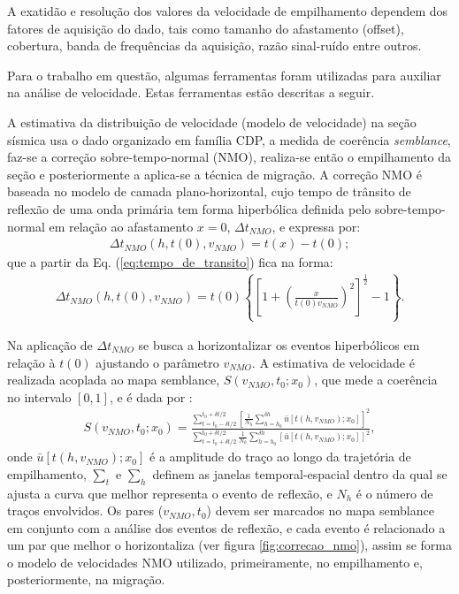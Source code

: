 A exatidão e resolução dos valores da velocidade de empilhamento dependem dos
fatores de aquisição do dado, tais como tamanho do afastamento (offset), cobertura, banda de
frequências da aquisição, razão sinal-ruído entre outros.

Para o trabalho em questão, algumas ferramentas foram utilizadas para auxiliar na
análise de velocidade. Estas ferramentas estão descritas a seguir.

A estimativa da distribuição de velocidade (modelo de velocidade) na seção sísmica usa o dado organizado em família CDP, a medida de coerência \textit{semblance},
faz-se a correção sobre-tempo-normal (NMO), realiza-se então o empilhamento da seção e posteriormente a aplica-se a técnica de migração.
A correção NMO é baseada no modelo de camada plano-horizontal, cujo tempo de trânsito de reflexão de uma onda primária tem forma hiperbólica definida pelo sobre-tempo-normal
em relação ao afastamento $x=0$, $\Delta t_{NMO}$, e expressa por:
\begin{eqnarray}
\Delta t_{NMO}(h,t(0),v_{NMO})=t(x)-t(0);
\label{t_NMO}
\end{eqnarray}
que a partir da Eq. (\ref{eq:tempo_de_transito}) fica na forma:
\begin{eqnarray}
\Delta t_{NMO}(h,t(0),v_{NMO})=t(0)\left\lbrace \left[ 1 + \left( \frac{x}{t(0)v_{NMO}}\right)^2\right]^{\frac{1}{2}}-1\right\rbrace.
\label{t_NMO_2}
\end{eqnarray}

Na aplicação de $\Delta t_{NMO}$ se busca a horizontalizar os eventos hiperbólicos em relação à $t(0)$ ajustando o parâmetro $v_{NMO}$. A estimativa de velocidade é realizada acoplada ao mapa semblance, $S(v_{NMO},t_0;x_0)$, que mede a coerência no intervalo $[0,1]$, e é dada por \citep{Sguazzero(1987)}:
\begin{eqnarray}
S\left(v_{NMO}, t_{0} ; x_{0}\right)=\frac{\displaystyle\sum_{t=t_{0}-\delta t / 2}^{t_{0}+\delta t / 2}\left[\frac{1}{N_{h}}\displaystyle\sum_{h=h_{0}}^{\delta h} \bar{u}\left[t\left(h, v_{N M O}\right) ; x_{0}\right]\right]^{2}}{\displaystyle\sum_{t=t_{0}+\delta t / 2}^{t_{0}+\delta t / 2} \frac{1}{N_{h}}\displaystyle\sum_{h=h_{0}}^{\delta h}\left[\bar{u}\left[t\left(h, v_{N M O}\right) ; x_{0}\right]\right]^{2}},
\label{eq:semblance}
\end{eqnarray}
onde $\bar{u}[t(h,v_{NMO});x_0]$ \'e a amplitude do tra\c{c}o ao longo da trajetória de empilhamento, $\sum_t$ e $\sum_h$ definem as janelas temporal-espacial dentro da qual se ajusta a curva que melhor representa o evento de reflex\~ao, e $N_h$ é o número de traços envolvidos. Os pares ($v_{NMO},t_0$) devem ser marcados no mapa semblance em conjunto com a an\'alise dos eventos de reflexão, e cada evento é relacionado a um par que melhor o horizontaliza (ver figura \ref{fig:correcao_nmo}), assim se forma o modelo de velocidades NMO utilizado, primeiramente, no empilhamento e, posteriormente, na migração.

